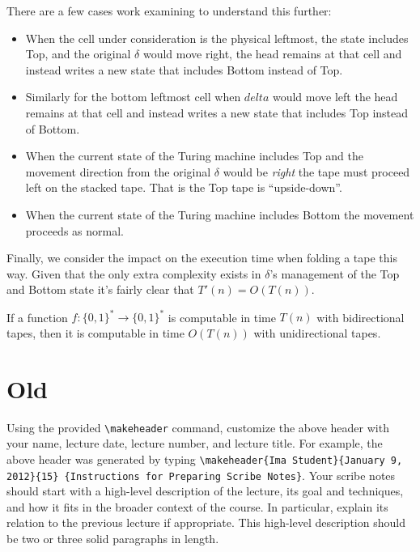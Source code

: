 \documentclass[usletter]{article}
\begin{document}
There are a few cases work examining to understand this further:

\begin{itemize}
  \item When the cell under consideration is the physical leftmost, the state includes Top, and the original $\delta$ would move right, the head remains at that cell and instead writes a new state that includes Bottom instead of Top.
  \item Similarly for the bottom leftmost cell when $delta$ would move left the head remains at  that cell and instead writes a new state that includes Top instead of Bottom.
  \item When the current state of the Turing machine includes Top and the movement direction from the original $\delta$ would be \textit{right} the tape must proceed left on the stacked tape. That is the Top tape is ``upside-down''.
  \item When the current state of the Turing machine includes Bottom the movement proceeds as normal.
\end{itemize}

Finally, we consider the impact on the execution time when folding a tape this way. Given that the only extra complexity exists in $\delta$'s management of the Top and Bottom state it's fairly clear that $T'(n) = O(T(n))$.

\begin{theorem}
  If a function $f:\{0,1\}^* \rightarrow \{0,1\}^*$ is computable in time $T(n)$ with bidirectional tapes, then it is computable in time $O(T(n))$ with unidirectional tapes.
\end{theorem}



\newpage

\section{Old}

Using the provided \verb|\makeheader| command,
customize the above header with your name,
lecture date, lecture number, and lecture title. For
example, the above header was generated by typing
\verb|\makeheader{Ima Student}{January 9, 2012}{15}|{\tt
\{Instructions for Preparing Scribe Notes\}}.  Your
scribe notes should start with a high-level description
of the lecture, its goal and techniques, and how it
fits in the broader context of the course. In
particular, explain its relation to the previous
lecture if appropriate.  This high-level description
should be two or three solid paragraphs in length.
\end{document}
